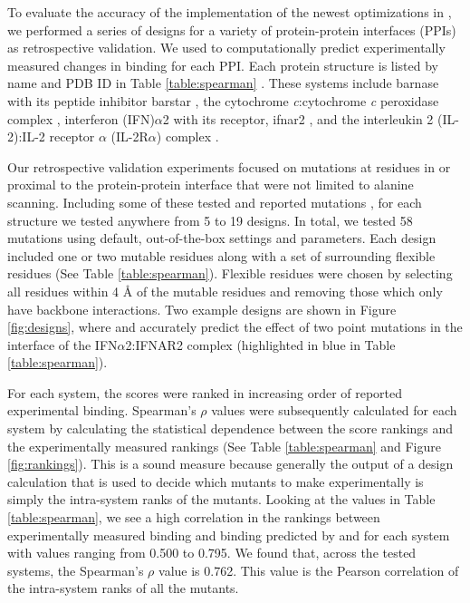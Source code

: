 To evaluate the accuracy of the implementation of the newest optimizations in , we performed a series of designs for a variety of protein-protein interfaces (PPIs) as retrospective validation. We used \ks \cite{K*} to computationally predict experimentally measured changes in binding for each PPI. Each protein structure is listed by name and PDB ID in Table \ref{table:spearman} \cite{pdb1x1u,pdb2pcb,pdb3s9d,pdb2b5i}.  These systems include barnase with its peptide inhibitor barstar \cite{binding2barnase,bindingbarnase}, the cytochrome {\it c}:cytochrome {\it c} peroxidase complex \cite{bindingcytc}, interferon (IFN)$\alpha$2 with its receptor, ifnar2  \cite{bindingifna2}, and the interleukin 2 (IL-2):IL-2 receptor $\alpha$ (IL-2R$\alpha$) complex \cite{bindingil2}.

Our retrospective validation experiments focused on mutations at residues in or proximal to the protein-protein interface that were not limited to alanine scanning. Including some of these tested and reported mutations \cite{binding2barnase,bindingbarnase,bindingcytc,bindingifna2,bindingil2}, for each structure we tested anywhere from 5 to 19 designs. In total, we tested 58 mutations using default, out-of-the-box  settings and parameters. Each design included one or two mutable residues along with a set of surrounding flexible residues (See Table \ref{table:spearman}). Flexible residues were chosen by selecting all residues within 4 {\AA} of the mutable residues and removing those which only have backbone interactions. Two example designs are shown in Figure \ref{fig:designs}, where  and \ks accurately predict the effect of two point mutations in the interface of the IFN$\alpha$2:IFNAR2 complex (highlighted in blue in Table \ref{table:spearman}). 

For each system, the \ks scores were ranked in increasing order of reported experimental binding. Spearman's $\rho$ values were subsequently calculated for each system by calculating the statistical dependence between the \ks score rankings and the experimentally measured rankings (See Table \ref{table:spearman} and Figure \ref{fig:rankings}). This is a sound measure because generally the output of a design calculation that is used to decide which mutants to make experimentally is simply the intra-system ranks of the mutants. Looking at the values in Table \ref{table:spearman}, we see a high correlation in the rankings between experimentally measured binding and binding predicted by  and \ks for each system with values ranging from 0.500 to 0.795. We found that, across the tested systems, the Spearman's $\rho$ value is 0.762. This value is the Pearson correlation of the intra-system ranks of all the mutants.      




